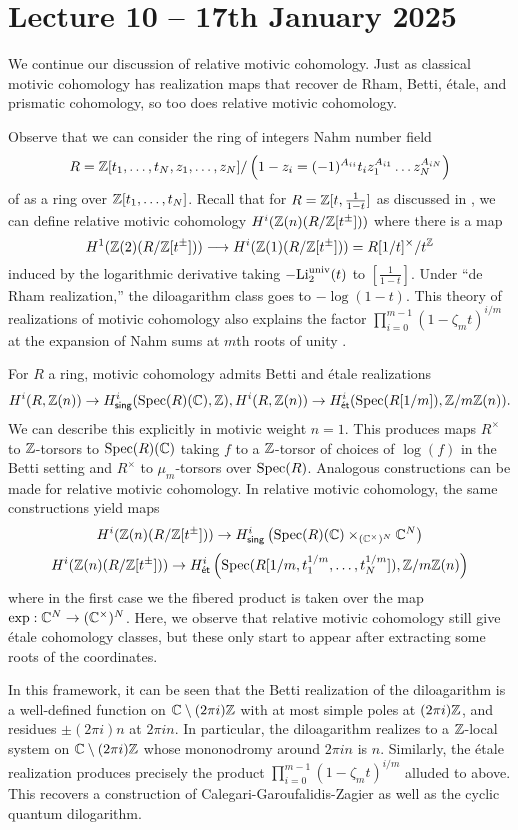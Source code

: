 \section{Lecture 10 -- 17th January 2025}\label{sec: lecture 10}
We continue our discussion of relative motivic cohomology. Just as classical motivic cohomology has realization maps that recover de Rham, Betti, \'{e}tale, and prismatic cohomology, so too does relative motivic cohomology. 

Observe that we can consider the ring of integers Nahm number field 
$$R=\mathbb{Z}[t_{1},\dots,t_{N},z_{1},\dots,z_{N}]/\left(1-z_{i}=(-1)^{A_{ii}}t_{i}z_{1}^{A_{i1}}\dots z_{N}^{A_{iN}}\right)$$
of  as a ring over $\mathbb{Z}[t_{1},\dots,t_{N}]$. Recall that for $R=\mathbb{Z}[t,\frac{1}{1-t}]$ as discussed in , we can define relative motivic cohomology $H^{i}(\mathbb{Z}(n)(R/\mathbb{Z}[t^{\pm}]))$ where there is a map 
$$H^{1}(\mathbb{Z}(2)(R/\mathbb{Z}[t^{\pm}]))\longrightarrow H^{i}(\mathbb{Z}(1)(R/\mathbb{Z}[t^{\pm}]))=R[1/t]^{\times}/t^{\mathbb{Z}}$$
induced by the logarithmic derivative taking $-\mathrm{Li}^{\mathrm{univ}}_{2}(t)$ to $[\frac{1}{1-t}]$. Under ``de Rham realization,'' the diloagarithm class goes to $-\log(1-t)$. This theory of realizations of motivic cohomology also explains the factor $\prod_{i=0}^{m-1}(1-\zeta_{m}t)^{i/m}$ at the expansion of Nahm sums at $m$th roots of unity .

For $R$ a ring, motivic cohomology admits Betti and \'{e}tale realizations
$$H^{i}(R,\mathbb{Z}(n))\to H^{i}_{\mathsf{sing}}(\operatorname{Spec}(R)(\mathbb{C}),\mathbb{Z}), H^{i}(R,\mathbb{Z}(n))\to H^{i}_{\mathsf{\acute{e}t}}(\operatorname{Spec}(R[1/m]),\mathbb{Z}/m\mathbb{Z}(n)).$$
We can describe this explicitly in motivic weight $n=1$. This produces maps $R^{\times}$ to $\mathbb{Z}$-torsors to $\operatorname{Spec}(R)(\mathbb{C})$ taking $f$ to a $\mathbb{Z}$-torsor of choices of $\log(f)$ in the Betti setting and $R^{\times}$ to $\mu_{m}$-torsors over $\operatorname{Spec}(R)$. Analogous constructions can be made for relative motivic cohomology. In relative motivic cohomology, the same constructions yield maps
$$H^{i}(\mathbb{Z}(n)(R/\mathbb{Z}[t^{\pm}]))\to H^{i}_{\mathsf{sing}}\left(\operatorname{Spec}(R)(\mathbb{C})\times_{(\mathbb{C}^{\times})^{N}}\mathbb{C}^{N}\right)$$
$$ H^{i}(\mathbb{Z}(n)(R/\mathbb{Z}[t^{\pm}]))\to H^{i}_{\mathsf{\acute{e}t}}\left(\operatorname{Spec}(R[1/m, t_{1}^{1/m},\dots,t_{N}^{1/m}]),\mathbb{Z}/m\mathbb{Z}(n)\right)$$
where in the first case we the fibered product is taken over the map $\exp:\mathbb{C}^{N}\to(\mathbb{C}^{\times})^{N}$. Here, we observe that relative motivic cohomology still give \'{e}tale cohomology classes, but these only start to appear after extracting some roots of the coordinates. 

In this framework, it can be seen that the Betti realization of the diloagarithm is a well-defined function on $\mathbb{C}\setminus(2\pi i)\mathbb{Z}$ with at most simple poles at $(2\pi i)\mathbb{Z}$, and residues $\pm(2\pi i)n$ at $2\pi i n$. In particular, the diloagarithm realizes to a $\mathbb{Z}$-local system on $\mathbb{C}\setminus(2\pi i)\mathbb{Z}$ whose mononodromy around $2\pi i n$ is $n$. Similarly, the \'{e}tale realization produces precisely the product $\prod_{i=0}^{m-1}(1-\zeta_{m}t)^{i/m}$ alluded to above. This recovers a construction of Calegari-Garoufalidis-Zagier as well as the cyclic quantum dilogarithm. 